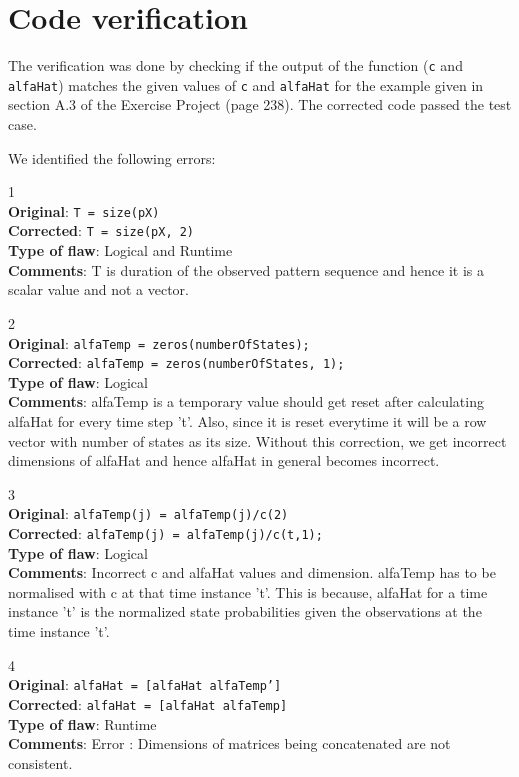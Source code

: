 \section{Code verification}
The verification was done by checking if the output of the function (\texttt{c} and \texttt{alfaHat}) matches the given values of \texttt{c} and \texttt{alfaHat} for the example given in section A.3 of the Exercise Project (page 238). The corrected code passed the test case.

We identified the following errors:

\large{1}\\
\textbf{Original}: \texttt{T = size(pX)}\\
\textbf{Corrected}: \texttt{T = size(pX, 2)}\\
\textbf{Type of flaw}: Logical and Runtime\\
\textbf{Comments}: T is duration of the observed pattern sequence and hence it is a scalar value and not a vector.

\large{2}\\
\textbf{Original}: \texttt{alfaTemp = zeros(numberOfStates);}\\
\textbf{Corrected}: \texttt{alfaTemp = zeros(numberOfStates, 1);}\\
\textbf{Type of flaw}: Logical\\
\textbf{Comments}: alfaTemp is a temporary value should get reset after calculating alfaHat for every time step 't'. Also, since it is reset everytime it will be a row vector with number of states as its size. Without this correction, we get incorrect dimensions of alfaHat and hence alfaHat in general becomes incorrect.

\large{3}\\
\textbf{Original}: \texttt{alfaTemp(j) = alfaTemp(j)/c(2)}\\
\textbf{Corrected}: \texttt{alfaTemp(j) = alfaTemp(j)/c(t,1);}\\
\textbf{Type of flaw}: Logical\\
\textbf{Comments}: Incorrect c and alfaHat values and dimension. alfaTemp has to be normalised with c at that time instance 't'. This is because, alfaHat for a time instance 't' is the normalized state probabilities given the observations at the time instance 't'.

\large{4}\\
\textbf{Original}: \texttt{alfaHat = [alfaHat alfaTemp']}\\
\textbf{Corrected}: \texttt{alfaHat = [alfaHat alfaTemp]}\\
\textbf{Type of flaw}: Runtime\\
\textbf{Comments}: Error : Dimensions of matrices being concatenated are not consistent.

